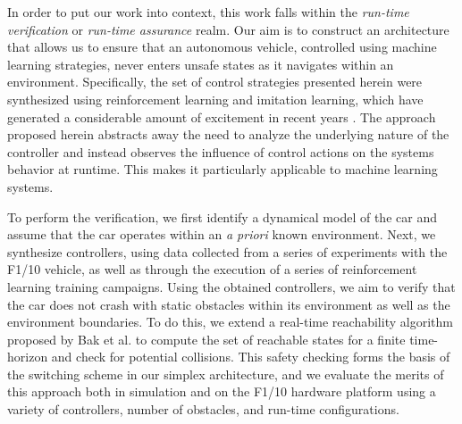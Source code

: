 \documentclass[manuscript,screen,review]{acmart}
\newcommand{\todo}[1]{\textcolor{red}{\textbf{\underline{TODO:}} #1}}
\begin{document}
In order to put our work into context, this work falls within the \textit{run-time verification} or \textit{run-time assurance} realm. Our aim is to construct an architecture that allows us to ensure that an autonomous vehicle, controlled using machine learning strategies, never enters unsafe states as it navigates within an environment. Specifically, the set of control strategies presented herein were synthesized using reinforcement learning and imitation learning, which have generated a considerable amount of excitement in recent years \cite{bojarski2016end,lillicrap2015continuous}. The approach proposed herein abstracts away the need to analyze the underlying nature of the controller and instead observes the influence of control actions on the systems behavior at runtime. This makes it particularly applicable to machine learning systems. 

To perform the verification, we first identify a dynamical model of the car and assume that the car operates within an \textit{a priori} known environment. Next, we synthesize controllers, using data collected from a series of experiments with the F1/10 vehicle, as well as through the execution of a series of reinforcement learning training campaigns. Using the obtained controllers, we aim to verify that the car does not crash with static obstacles within its environment as well as the environment boundaries. To do this, we extend a real-time reachability algorithm proposed by Bak et al. \cite{Bak2014,Johnson2016} to compute the set of reachable states for a finite time-horizon and check for potential collisions. This safety checking forms the basis of the switching scheme in our simplex architecture, and we evaluate the merits of this approach both in simulation and on the F1/10 hardware platform using a variety of controllers, number of obstacles, and run-time configurations.
\end{document}
